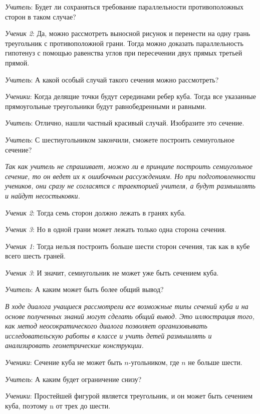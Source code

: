\documentclass[a4paper,14pt,russian]{extreport}
\begin{document}
\textit{Учитель}: Будет ли сохраняться требование параллельности противоположных сторон в таком случае?

\textit{Ученик 2}: Да, можно рассмотреть выносной рисунок и перенести на одну грань треугольник с противоположной грани. Тогда можно доказать параллельность гипотенуз с помощью равенства углов при пересечении двух прямых третьей прямой.

\textit{Учитель}: А какой особый случай такого сечения можно рассмотреть?

\textit{Ученики}: Когда делящие точки будут серединами ребер куба. Тогда все указанные прямоугольные треугольники будут равнобедренными и равными.

\textit{Учитель}: Отлично, нашли частный красивый случай. Изобразите это сечение.

\textit{Учитель}: С шестиугольником закончили, сможете построить семиугольное сечение?

\textit{Так как учитель не спрашивает, можно ли в принципе построить семиугольное сечение, то он ведет их к ошибочным рассуждениям. Но при подготовленности учеников, они сразу не согласятся с траекторией учителя, а будут размышлять и найдут несостыковки.}

\textit{Ученик 2}: Тогда семь сторон должно лежать в гранях куба.

\textit{Ученик 3}: Но в одной грани может лежать только одна сторона сечения.

\textit{Ученик 1}: Тогда нельзя построить больше шести сторон сечения, так как в кубе всего шесть граней.

\textit{Ученик 3}: И значит, семиугольник не может уже быть сечением куба.

\textit{Учитель}: А каким может быть более общий вывод?

\textit{В ходе диалога учащиеся рассмотрели все возможные типы сечений куба и на основе полученных знаний могут сделать общий вывод. Это иллюстрация того, как метод неосократического диалога позволяет организовывать исследовательскую работы в классе и учить детей размышлять и анализировать геометрические конструкции.}

\textit{Ученики}: Сечение куба не может быть $n$-угольником, где $n$ не больше шести.

\textit{Учитель}: А каким будет ограничение снизу?

\textit{Ученики}: Простейшей фигурой является треугольник, и он может  быть сечением куба, поэтому n от трех до шести.
\end{document}
